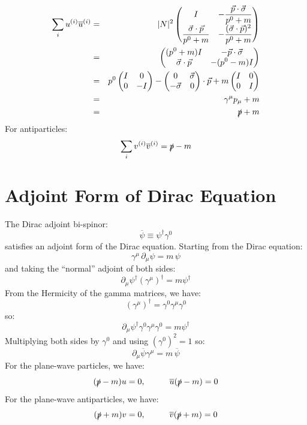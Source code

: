 \documentclass[12pt]{article}
\begin{document}
\begin{eqnarray*}
\sum_i u^{(i)} \overline{u}^{(i)}  &=& |N|^2
\begin{pmatrix}
\displaystyle I & -\displaystyle \frac{\vec{p}\cdot \vec{\sigma}}{p^0+m} \\
\displaystyle \frac{\vec{\sigma}\cdot\vec{p}}{p^0+m} &
-\displaystyle \frac{(\vec{\sigma}\cdot\vec{p})^2}{p^0+m}\\
\end{pmatrix}\\
&=&
\begin{pmatrix}
\displaystyle (p^0+m) I & \displaystyle -\vec{p}\cdot \vec{\sigma} \\
\displaystyle \vec{\sigma}\cdot\vec{p} &
\displaystyle -(p^0-m) I\\
\end{pmatrix}\\
&=& p^0 \begin{pmatrix} I & 0 \\ 0 & -I \end{pmatrix}
- \begin{pmatrix} 0 & \vec{\sigma} \\ -\vec{\sigma} & 0 \end{pmatrix} \cdot \vec{p}
+ m \begin{pmatrix} I & 0 \\ 0 & I \end{pmatrix} \\
&=& \gamma^\mu p_\mu + m \\
&=& \slashed{p} + m \\
\end{eqnarray*}
For antiparticles:
$$\sum_i v^{(i)} \overline{v}^{(i)} = \slashed{p} - m$$


\section{Adjoint Form of Dirac Equation}

The Dirac adjoint bi-spinor:
$$\overline{\psi} \equiv \psi^\dagger \gamma^0$$
satisfies an adjoint form of the Dirac equation.  Starting from the Dirac equation:
$$\gamma^\mu \, \partial_\mu \psi = m \, \psi $$
and taking the ``normal'' adjoint of both sides:
$$\partial_\mu \psi^\dagger (\gamma^\mu)^\dagger = m \psi^\dagger  $$
From the Hermicity of the gamma matrices, we have:
$$(\gamma^\mu)^\dagger = \gamma^0 \gamma^\mu \gamma^0$$
so:
$$\partial_\mu \psi^\dagger \gamma^0 \gamma^\mu \gamma^0 = m \psi^\dagger$$
Multiplying both sides by $\gamma^0$ and using $(\gamma^0)^2=1$ so:
$$\partial_\mu \overline{\psi}  \gamma^\mu  =  m \, \overline{\psi}$$
For the plane-wave particles, we have:
$$(\slashed{p} - m) u = 0, \hspace{1cm} \overline{u} (\slashed{p} - m) = 0$$
For the plane-wave antiparticles, we have:
$$(\slashed{p} + m) v = 0, \hspace{1cm} \overline{v} (\slashed{p} + m) = 0$$
\end{document}
